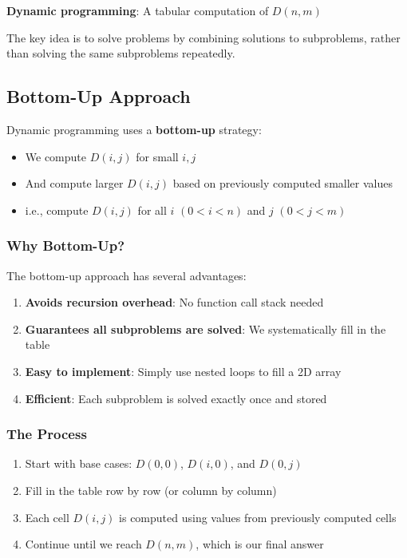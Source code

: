 \documentclass[11pt,a4paper]{article}
\theoremstyle{definition}
\theoremstyle{plain}
\theoremstyle{remark}
\begin{document}
\begin{tcolorbox}[colback=cyan!10!white,colframe=cyan!75!black,title=\textbf{Dynamic Programming}]
\textbf{Dynamic programming}: A tabular computation of $D(n,m)$

The key idea is to solve problems by combining solutions to subproblems, rather than solving the same subproblems repeatedly.
\end{tcolorbox}

\subsection{Bottom-Up Approach}

Dynamic programming uses a \textbf{bottom-up} strategy:

\begin{itemize}
    \item We compute $D(i,j)$ for small $i,j$
    \item And compute larger $D(i,j)$ based on previously computed smaller values
    \item i.e., compute $D(i,j)$ for all $i$ $(0 < i < n)$ and $j$ $(0 < j < m)$
\end{itemize}

\subsubsection{Why Bottom-Up?}

The bottom-up approach has several advantages:

\begin{enumerate}
    \item \textbf{Avoids recursion overhead}: No function call stack needed
    \item \textbf{Guarantees all subproblems are solved}: We systematically fill in the table
    \item \textbf{Easy to implement}: Simply use nested loops to fill a 2D array
    \item \textbf{Efficient}: Each subproblem is solved exactly once and stored
\end{enumerate}

\subsubsection{The Process}

\begin{enumerate}
    \item Start with base cases: $D(0,0)$, $D(i,0)$, and $D(0,j)$
    \item Fill in the table row by row (or column by column)
    \item Each cell $D(i,j)$ is computed using values from previously computed cells
    \item Continue until we reach $D(n,m)$, which is our final answer
\end{enumerate}
\end{document}
